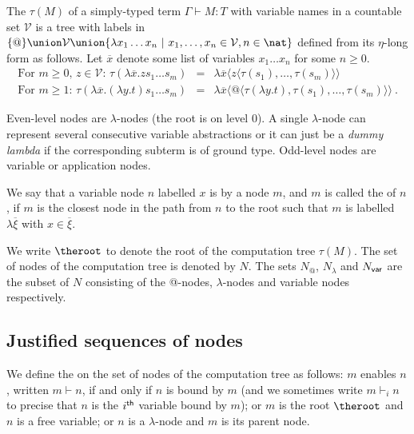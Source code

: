 \begin{definition}\rm
\label{dfn:comptree}
  The  $\tau(M)$ of a simply-typed term
  $\Gamma \vdash M:T$ with variable names in a countable set
  $\mathcal{V}$ is a tree with labels in $ \{ @ \} \union \mathcal{V}
  \union \{ \lambda x_1 \ldots x_n \ | \ x_1 ,\ldots, x_n \in
  \mathcal{V}, n\in\nat \}$ defined from its $\eta$-long form as follows.
  Let $\overline{x}$ denote some list of variables $x_1 \ldots x_n$ for some $n\geq 0$.
\begin{eqnarray*}
  \mbox{For $m\geq 0$, $z \in \mathcal{V}$: } \tau(\lambda \overline{x} . z s_1 \ldots s_m ) &=& \lambda \overline{x} \langle z \langle\tau(s_1),\ldots,\tau(s_m)\rangle\rangle \\
  \mbox{For $m \geq 1$: } \tau(\lambda \overline{x} . (\lambda y.t) s_1 \ldots s_m) &=& \lambda \overline{x} \langle @ \langle \tau(\lambda y.t),\tau(s_1),\ldots,\tau(s_m) \rangle \rangle \ .
\end{eqnarray*}
\end{definition}

Even-level nodes are $\lambda$-nodes (the root is on level 0). A single $\lambda$-node can represent several consecutive variable abstractions or it can just be a \emph{dummy lambda} if the corresponding subterm is of ground type.  Odd-level nodes are variable or application nodes.

We say that a variable node $n$ labelled $x$ is  by a node $m$, and $m$ is called the  of $n$, if $m$ is the closest node in the path from $n$ to the root such that $m$ is labelled $\lambda \overline{\xi}$ with $x\in \overline{\xi}$.


We write $\theroot$ to denote the root of the computation tree $\tau(M)$. The set of nodes of the computation tree is denoted by $N$. The sets $N_@$, $N_\lambda$ and $N_{\sf var}$ are the subset of $N$ consisting of the @-nodes, $\lambda$-nodes and variable nodes respectively.


\subsection{Justified sequences of nodes}

We define the  on the set of nodes of the computation tree as follows: $m$ enables $n$, written $m \vdash n$, if and only if $n$ is bound by $m$ (and we sometimes write $m \vdash_i n$ to precise that $n$ is the $i^{\sf th}$ variable bound by $m$); or $m$ is the root $\theroot$ and $n$ is a free variable; or $n$ is a $\lambda$-node and $m$ is its parent node.


